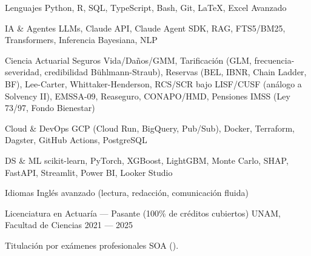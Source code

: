 \documentclass[10pt, letterpaper]{awesome-cv}
\begin{document}
\begin{cvskills}
  \cvskill
    {Lenguajes}
    {Python, R, SQL, TypeScript, Bash, Git, \LaTeX, Excel Avanzado}

  \cvskill
    {IA \& Agentes}
    {LLMs, Claude API, Claude Agent SDK, RAG, FTS5/BM25, Transformers, Inferencia Bayesiana, NLP}

  \cvskill
    {Ciencia Actuarial}
    {Seguros Vida/Daños/GMM, Tarificación (GLM, frecuencia-severidad, credibilidad Bühlmann-Straub), Reservas (BEL, IBNR, Chain Ladder, BF), Lee-Carter, Whittaker-Henderson, RCS/SCR bajo LISF/CUSF (análogo a Solvency II), EMSSA-09, Reaseguro, CONAPO/HMD, Pensiones IMSS (Ley 73/97, Fondo Bienestar)}

  \cvskill
    {Cloud \& DevOps}
    {GCP (Cloud Run, BigQuery, Pub/Sub), Docker, Terraform, Dagster, GitHub Actions, PostgreSQL}

  \cvskill
    {DS \& ML}
    {scikit-learn, PyTorch, XGBoost, LightGBM, Monte Carlo, SHAP, FastAPI, Streamlit, Power BI, Looker Studio}

  \cvskill
    {Idiomas}
    {Inglés avanzado (lectura, redacción, comunicación fluida)}
\end{cvskills}


\begin{cventries}
  \cventry
    {Licenciatura en Actuaría — Pasante (100\% de créditos cubiertos)}
    {UNAM, Facultad de Ciencias}
    {}
    {2021 — 2025}
    {
      \begin{cvitems}
        \item {Titulación por exámenes profesionales SOA ().}
      \end{cvitems}
    }
\end{cventries}

\end{document}
